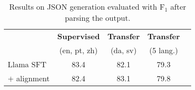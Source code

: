 \begin{table}[t!]
    \small
    \centering
    \setlength\tabcolsep{8pt}
    \begin{tabular}{l c c c c}
    \toprule
    &\textbf{Supervised} 
    & \textbf{Transfer}
    & \textbf{Transfer}
    \\
    & 
    (en, pt, zh) &
    (da, sv) &
    (5 lang.)
    \\
    \midrule
    Llama SFT  &
    83.4 & 
    82.1 & 
    79.3
    \\
    $+$ alignment  &
    82.4 & 
    83.1 & 
    79.8
    \\
    \bottomrule
    \end{tabular}
    \caption{Results on JSON generation evaluated with F$_1$ after parsing the output. \label{tab:uner}}
\end{table}
